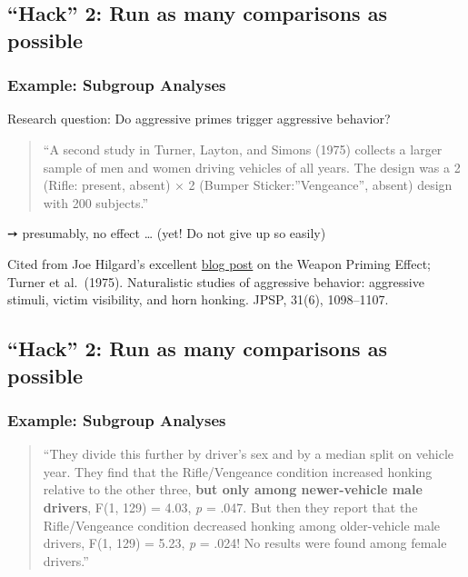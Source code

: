 \documentclass[
  letterpaper,
  DIV=11,
  numbers=noendperiod]{scrartcl}
\begin{document}
\subsection{``Hack'' 2: Run as many comparisons as
possible}\label{hack-2-run-as-many-comparisons-as-possible-1}

\subsubsection{Example: Subgroup
Analyses}\label{example-subgroup-analyses}

Research question: Do aggressive primes trigger aggressive behavior?

\begin{quote}
``A second study in Turner, Layton, and Simons (1975) collects a larger
sample of men and women driving vehicles of all years. The design was a
2 (Rifle: present, absent) × 2 (Bumper Sticker:''Vengeance'', absent)
design with 200 subjects.''
\end{quote}

➙ presumably, no effect \ldots{} (yet! Do not give up so easily)

Cited from Joe Hilgard's excellent
\href{http://crystalprisonzone.blogspot.com/2016/03/the-weapons-priming-effect.html}{blog
post} on the Weapon Priming Effect; Turner et al.~(1975). Naturalistic
studies of aggressive behavior: aggressive stimuli, victim visibility,
and horn honking. JPSP, 31(6), 1098--1107.

\subsection{``Hack'' 2: Run as many comparisons as
possible}\label{hack-2-run-as-many-comparisons-as-possible-2}

\subsubsection{Example: Subgroup
Analyses}\label{example-subgroup-analyses-1}

\begin{quote}
``They divide this further by driver's sex and by a median split on
vehicle year. They find that the Rifle/Vengeance condition increased
honking relative to the other three, \textbf{but only among
newer-vehicle male drivers}, F(1, 129) = 4.03, {\emph{p} = .047}. But
then they report that the Rifle/Vengeance condition decreased honking
among older-vehicle male drivers, F(1, 129) = 5.23, {\emph{p} = .024}!
No results were found among female drivers.''
\end{quote}
\end{document}
